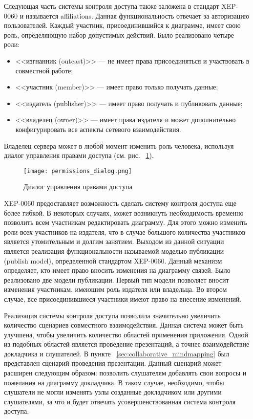 Следующая часть системы контроля доступа также заложена в стандарт XEP-0060 и
называется affiliations. Данная функциональность отвечает за авторизацию
пользователей. Каждый участник, присоединившийся к диаграмме, имеет свою роль,
определяющую набор допустимых действий. Было реализовано четыре роли:
\begin{itemize}
\item <<изгнанник (outcast)>> --- не имеет права присоединяться и участвовать в
совместной работе;
\item <<участник (member)>> --- имеет право только получать данные;
\item <<издатель (publisher)>> --- имеет право получать и публиковать данные;
\item <<владелец (owner)>> ---  имеет права издателя и может дополнительно
конфигурировать все аспекты сетевого взаимодействия.
\end{itemize}
Владелец сервера может в любой момент изменить роль человека, используя диалог
управления правами доступа (см. рис. ~\ref{img:permissions_dialog}).

\begin{figure}
  \centering
  \texttt{[image: permissions\_dialog.png]}
  \caption{Диалог управления правами доступа}
  \label{img:permissions_dialog}
\end{figure}

XEP-0060 предоставляет возможность сделать систему контроля доступа еще более
гибкой. В некоторых случаях, может возникнуть необходимость временно позволить
всем участникам редактировать диаграмму. Для этого можно изменить роли всех
участников на издателя, что в случае большого количества участников является
утомительным и долгим занятием. Выходом из данной ситуации является реализация
функциональности называемой моделью публикации (publish model), определенной
стандартом XEP-0060. Данный механизм определяет, кто имеет право вносить
изменения на диаграмму связей. Было реализовано две модели публикации. Первый
тип модели позволяет вносит изменения участникам, имеющим роль издателя или
владельца. Во втором случае, все присоединившиеся участники имеют право на
внесение изменений.

Реализация системы контроля доступа позволила значительно увеличить количество
сценариев совместного взаимодействия. Данная система может быть улучшена, чтобы
увеличить количество областей применения приложения. Одной из подобных областей
является проведение презентаций, а точнее взаимодействие докладчика и
слушателей. В пункте ~\ref{sec:collaborative_mindmapping} был представлен
сценарий проведения презентации. Данный сценарий может расширен следующим
образом: позволить слушателям добавлять свои вопросы и пожелания на диаграмму
докладчика. В таком случае, необходимо, чтобы слушатели не могли изменять узлы
созданные докладчиком или другими слушателями, за что и будет отвечать
усовершенствованная система контроля доступа.
